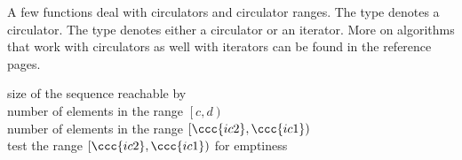 A few functions deal with circulators and circulator ranges. The type
 denotes a circulator. The type  denotes either a circulator
or an iterator. More on algorithms that work with circulators as well with
iterators can be found in the reference pages.


\begin{tabbing}
   \>
      size of the sequence reachable by \\
   \>
      number of elements in the range $\left[c, d\right)$ \\
   \>
      number of elements in the range $\left[\ccc{ic2}, \ccc{ic1}\right)$ \\
   \>
      test the range $\left[\ccc{ic2}, \ccc{ic1}\right)$ for emptiness
\end{tabbing}


